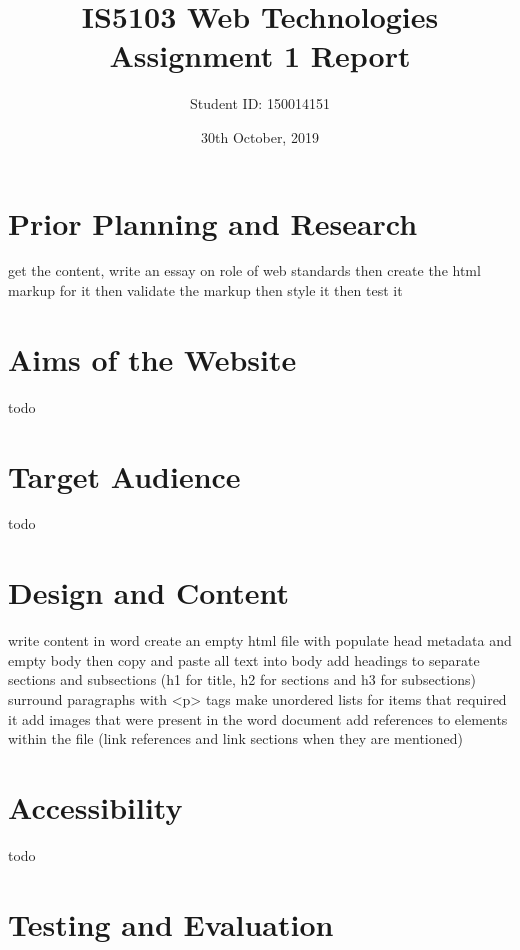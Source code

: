 \documentclass[letterpaper,12pt]{article}
\begin{document}
\title{IS5103 Web Technologies\\Assignment 1 Report}
\author{Student ID: 150014151}
\date{30th October, 2019}
\maketitle
\newpage

\tableofcontents
\newpage



\section{Prior Planning and Research}

get the content, write an essay on role of web standards
then create the html markup for it
then validate the markup
then style it
then test it

\section{Aims of the Website}

todo

\section{Target Audience}

todo

\section{Design and Content}

write content in word
create an empty html file with populate head metadata and empty body
then copy and paste all text into body
add headings to separate sections and subsections (h1 for title, h2 for sections and h3 for subsections)
surround paragraphs with <p> tags
make unordered lists for items that required it
add images that were present in the word document
add references to elements within the file (link references and link sections when they are mentioned) 


\section{Accessibility}

todo

\section{Testing and Evaluation}
\end{document}
